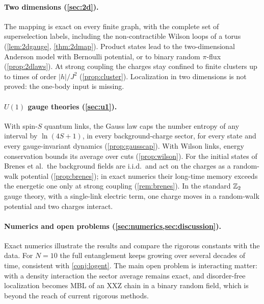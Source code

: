\documentclass[11pt]{article}
\theoremstyle{stmtplain}
\theoremstyle{stmtdef}
\begin{document}
\paragraph{Two dimensions (\cref{sec:2d}).}
The mapping is exact on every finite graph, with the complete set of superselection labels, including the
non-contractible Wilson loops of a torus (\cref{lem:2dgauge}, \cref{thm:2dmap}). Product states lead to the
two-dimensional Anderson model with Bernoulli potential, or to binary random $\pi$-flux (\cref{prop:2dlaws}). At
strong coupling the charges stay confined to finite clusters up to times of order $|h|/J^2$ (\cref{prop:cluster}).
Localization in two dimensions is not proved: the one-body input is missing.

\paragraph{$U(1)$ gauge theories (\cref{sec:u1}).}
With spin-$S$ quantum links, the Gauss law caps the number entropy of any interval by $\ln(4S+1)$, in every
background-charge sector, for every state and every gauge-invariant dynamics (\cref{prop:gausscap}). With Wilson
links, energy conservation bounds its average over cuts (\cref{prop:wilson}). For the initial states of Brenes et al.\ the background fields are i.i.d.\ and act on the
charges as a random-walk potential (\cref{prop:brenes}); in exact numerics their long-time memory exceeds the energetic
one only at strong coupling (\cref{rem:brenes}). In the standard $\mathbb{Z}_2$ gauge theory,
with a single-link electric term, one charge moves in a random-walk potential and two charges interact.

\paragraph{Numerics and open problems (\cref{sec:numerics,sec:discussion}).}
Exact numerics illustrate the results and compare the rigorous constants with the data. For $N=10$ the full
entanglement keeps growing over several decades of time, consistent with \cref{conj:logent}. The main open problem is
interacting matter: with a density interaction the sector average remains exact, and disorder-free localization
becomes MBL of an XXZ chain in a binary random field, which is beyond the reach of current rigorous methods.
\end{document}
